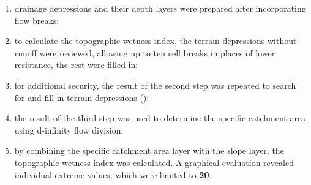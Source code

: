 \documentclass[
]{book}
\begin{document}
\begin{enumerate}
\def\labelenumi{\arabic{enumi}.}
\item
  drainage depressions and their depth layers were prepared after
  incorporating flow breaks;
\item
  to calculate the topographic wetness index, the terrain depressions without
  runoff were reviewed, allowing up to ten cell breaks in places of lower
  resistance, the rest were filled in;
\item
  for additional security, the result of the second step was repeated to
  search for and fill in terrain depressions ();
\item
  the result of the third step was used to determine the specific catchment
  area using d-infinity flow division;
\item
  by combining the specific catchment area layer with the slope layer,
  the topographic wetness index was calculated. A graphical evaluation revealed
  individual extreme values, which were limited to \textbf{20}.
\end{enumerate}
\end{document}
